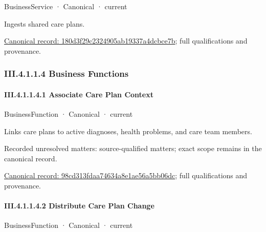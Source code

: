 \label{element:180d3f29c2324905ab19337a4dcbce7b}
{\small BusinessService · Canonical · current}\par

Ingests shared care plans.


{\footnotesize \href{../../../../continuum/business/business-service/180d3f29c2324905ab19337a4dcbce7b.md}{Canonical record: 180d3f29c2324905ab19337a4dcbce7b}; full qualifications and provenance.}\par
\subsubsection*{III.4.1.1.4 Business Functions}
\label{navigation:III.4.1.1.4}

\paragraph*{III.4.1.1.4.1 Associate Care Plan Context}
\label{navigation:III.4.1.1.4.1}

\label{element:98cd313fdaa74634a8e1ae56a5bb06dc}
{\small BusinessFunction · Canonical · current}\par

Links care plans to active diagnoses, health problems, and care team members.


{\small Recorded unresolved matters: source-qualified matters; exact scope remains in the canonical record.}\par
{\footnotesize \href{../../../../continuum/business/business-function/98cd313fdaa74634a8e1ae56a5bb06dc.md}{Canonical record: 98cd313fdaa74634a8e1ae56a5bb06dc}; full qualifications and provenance.}\par
\paragraph*{III.4.1.1.4.2 Distribute Care Plan Change}
\label{navigation:III.4.1.1.4.2}

\label{element:cbfa51308103418a9dffe23a2d8cfd87}
{\small BusinessFunction · Canonical · current}\par

